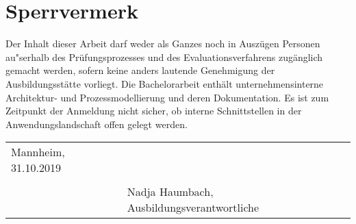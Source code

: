 \chapter*{Sperrvermerk}
Der Inhalt dieser Arbeit darf weder als Ganzes noch in Auszügen Personen au"serhalb des Prüfungsprozesses und des Evaluationsverfahrens zugänglich gemacht werden, sofern keine anders lautende Genehmigung der Ausbildungsstätte vorliegt. Die Bachelorarbeit enthält unternehmensinterne Architektur- und Prozessmodellierung und deren Dokumentation. Es ist zum Zeitpunkt der Anmeldung nicht sicher, ob interne Schnittstellen in der Anwendungslandschaft offen gelegt werden.



\vspace{3cm}
\begingroup
\begin{table}[h!]
	\setlength\tabcolsep{0pt}
	\begin{tabular}{p{6.5cm}p{8.5cm}}
		Mannheim, 31.10.2019 &  \\
		& \\
		& Nadja Haumbach, Ausbildungsverantwortliche \\
	\end{tabular}
\end{table}
